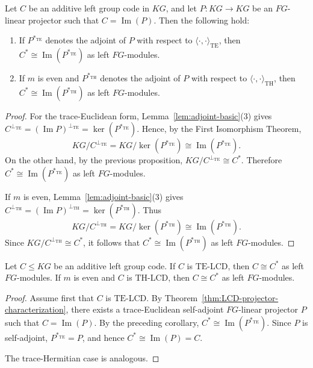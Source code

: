 \documentclass[11pt]{article}
\begin{document}
\begin{corollary}
Let $C$ be an additive left group code in $KG$, and let $P:KG\longrightarrow KG$ be an $FG$-linear projector such that $C=\operatorname{Im}(P)$. Then the following hold:
\begin{enumerate}
    \item If $P^{\ast_{\mathrm{TE}}}$ denotes the adjoint of $P$ with respect to $\langle\cdot,\cdot\rangle_{\mathrm{TE}}$, then $C^*\cong \operatorname{Im}(P^{\ast_{\mathrm{TE}}})$ as left $FG$-modules.

    \item If $m$ is even and $P^{\ast_{\mathrm{TH}}}$ denotes the adjoint of $P$ with respect to $\langle\cdot,\cdot\rangle_{\mathrm{TH}}$, then $C^*\cong \operatorname{Im}(P^{\ast_{\mathrm{TH}}})$ as left $FG$-modules.
\end{enumerate}
\end{corollary}

\begin{proof}
For the trace-Euclidean form, Lemma~\ref{lem:adjoint-basic}(3) gives $C^{\perp_{\mathrm{TE}}}=(\operatorname{Im}P)^{\perp_{\mathrm{TE}}}=\ker(P^{\ast_{\mathrm{TE}}})$. Hence, by the First Isomorphism Theorem,
$$
KG/C^{\perp_{\mathrm{TE}}}
=
KG/\ker(P^{\ast_{\mathrm{TE}}})
\cong
\operatorname{Im}(P^{\ast_{\mathrm{TE}}}).
$$
On the other hand, by the previous proposition, $KG/C^{\perp_{\mathrm{TE}}}\cong C^*$. Therefore $C^*\cong \operatorname{Im}(P^{\ast_{\mathrm{TE}}})$ as left $FG$-modules.

If $m$ is even, Lemma~\ref{lem:adjoint-basic}(3) gives $C^{\perp_{\mathrm{TH}}}=(\operatorname{Im}P)^{\perp_{\mathrm{TH}}}=\ker(P^{\ast_{\mathrm{TH}}})$. Thus
$$
KG/C^{\perp_{\mathrm{TH}}}
=
KG/\ker(P^{\ast_{\mathrm{TH}}})
\cong
\operatorname{Im}(P^{\ast_{\mathrm{TH}}}).
$$
Since $KG/C^{\perp_{\mathrm{TH}}}\cong C^*$, it follows that $C^*\cong \operatorname{Im}(P^{\ast_{\mathrm{TH}}})$ as left $FG$-modules.
\end{proof}
\begin{corollary}\label{cor:lcd-module-selfdual}
Let $C\leq KG$ be an additive left group code. If $C$ is
$\mathrm{TE}$-LCD, then $C\cong C^*$ as left $FG$-modules. If $m$ is even
and $C$ is $\mathrm{TH}$-LCD, then $C\cong C^*$ as left $FG$-modules.
\end{corollary}

\begin{proof}
Assume first that $C$ is $\mathrm{TE}$-LCD. By
Theorem~\ref{thm:LCD-projector-characterization}, there exists a
trace-Euclidean self-adjoint $FG$-linear projector $P$ such that
$C=\operatorname{Im}(P)$. By the preceding corollary,
$C^*\cong\operatorname{Im}(P^{\ast_{\mathrm{TE}}})$. Since $P$ is
self-adjoint, $P^{\ast_{\mathrm{TE}}}=P$, and hence
$C^*\cong\operatorname{Im}(P)=C$.

The trace-Hermitian case is analogous.
\end{proof}
\end{document}
